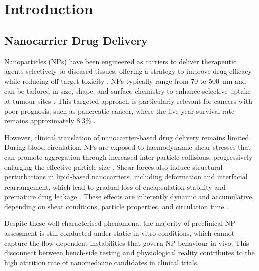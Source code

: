 
\chapter{Introduction}

\ifpdf
    \graphicspath{{Chapter1/Figs/Raster/}{Chapter1/Figs/PDF/}{Chapter1/Figs/}}
\else
    \graphicspath{{Chapter1/Figs/Vector/}{Chapter1/Figs/}}
\fi

\section{Nanocarrier Drug Delivery}

Nanoparticles (NPs) have been engineered as carriers to deliver
therapeutic agents selectively to diseased tissues, offering a
strategy to improve drug efficacy while reducing off-target
toxicity \citep{Yusuf2023, Mitchell2021}.
NPs typically range from 70 to \SI{500}{\nano\metre} and can be
tailored in size, shape, and surface chemistry to enhance
selective uptake at tumour sites \citep{Yusuf2023}.
This targeted approach is particularly relevant for cancers
with poor prognosis, such as pancreatic cancer, where the
five-year survival rate remains approximately 8.3\%
\citep{Sung2021}.

However, clinical translation of nanocarrier-based drug delivery
remains limited.
During blood circulation, NPs are exposed to haemodynamic
shear stresses that can promote aggregation through increased
inter-particle collisions, progressively enlarging the effective
particle size \citep{Lv2016, Shrestha2020}.
Shear forces also induce structural perturbations in
lipid-based nanocarriers, including deformation and interfacial
rearrangement, which lead to gradual loss of encapsulation
stability and premature drug leakage \citep{Karaz2023, Wang2021}.
These effects are inherently dynamic and accumulative,
depending on shear conditions, particle properties, and
circulation time \citep{Shrestha2020}.

Despite these well-characterised phenomena, the majority of
preclinical NP assessment is still conducted under static
in vitro conditions, which cannot capture the flow-dependent
instabilities that govern NP behaviour in vivo.
This disconnect between bench-side testing and physiological
reality contributes to the high attrition rate of nanomedicine
candidates in clinical trials.

